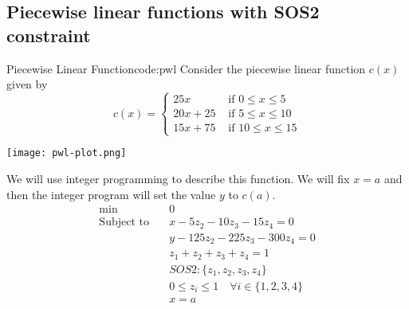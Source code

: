 \documentclass[../open-optimization/open-optimization.tex]{subfiles}
\begin{document}
\subsection{Piecewise linear functions with SOS2 constraint}
\begin{examplewithcode}{Piecewise Linear Function}{code:pwl}
\label{example:pwl}
Consider the piecewise linear function 
 $c(x)$ given by
$$
c(x) = 
\begin{cases}
25x  & \text{ if } 0 \leq x \leq 5\\
20x + 25 & \text{ if } 5 \leq x \leq 10\\
15x + 75 & \text{ if } 10 \leq x \leq 15
\end{cases}
$$
\begin{center}
\texttt{[image: pwl-plot.png]}
\end{center}
We will use integer programming to describe this function.  We will fix $x = a$ and then the integer program will set the value $y$ to $c(a)$.
\begin{align*}
\min\quad & 0\\
\text{Subject to} \quad & x - 5 z_{2} - 10 z_{3} - 15 z_{4} = 0\\
 & y - 125 z_{2} - 225 z_{3} - 300 z_{4} = 0\\
 & z_{1} + z_{2} + z_{3} + z_{4} = 1\\
 & SOS2: \{z_1, z_2, z_3, z_4\}\\
 & 0 \leq z_{i} \leq 1 \quad\forall i \in \{1,2,3,4\}\\
 & x = a\\
\end{align*}

\end{examplewithcode}
\end{document}
